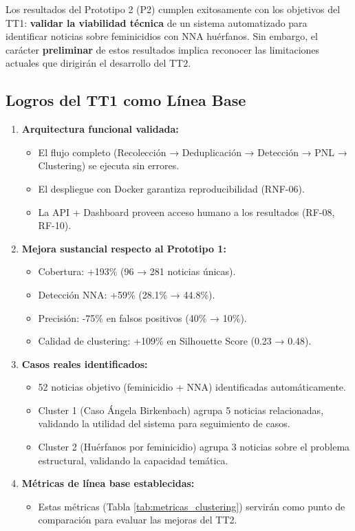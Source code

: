 Los resultados del Prototipo 2 (P2) cumplen exitosamente con los objetivos del TT1: \textbf{validar la viabilidad técnica} de un sistema automatizado para identificar noticias sobre feminicidios con NNA huérfanos. Sin embargo, el carácter \textbf{preliminar} de estos resultados implica reconocer las limitaciones actuales que dirigirán el desarrollo del TT2.

\subsection{Logros del TT1 como Línea Base}
\label{subsec:logros_tt1}

\begin{enumerate}
    \item \textbf{Arquitectura funcional validada:}
    \begin{itemize}
        \item El flujo completo (Recolección → Deduplicación → Detección → PNL → Clustering) se ejecuta sin errores.
        \item El despliegue con Docker garantiza reproducibilidad (RNF-06).
        \item La API + Dashboard proveen acceso humano a los resultados (RF-08, RF-10).
    \end{itemize}
    
    \item \textbf{Mejora sustancial respecto al Prototipo 1:}
    \begin{itemize}
        \item Cobertura: +193\% (96 → 281 noticias únicas).
        \item Detección NNA: +59\% (28.1\% → 44.8\%).
        \item Precisión: -75\% en falsos positivos (40\% → 10\%).
        \item Calidad de clustering: +109\% en Silhouette Score (0.23 → 0.48).
    \end{itemize}
    
    \item \textbf{Casos reales identificados:}
    \begin{itemize}
        \item 52 noticias objetivo (feminicidio + NNA) identificadas automáticamente.
        \item Cluster 1 (Caso Ángela Birkenbach) agrupa 5 noticias relacionadas, validando la utilidad del sistema para seguimiento de casos.
        \item Cluster 2 (Huérfanos por feminicidio) agrupa 3 noticias sobre el problema estructural, validando la capacidad temática.
    \end{itemize}
    
    \item \textbf{Métricas de línea base establecidas:}
    \begin{itemize}
        \item Estas métricas (Tabla \ref{tab:metricas_clustering}) servirán como punto de comparación para evaluar las mejoras del TT2.
    \end{itemize}
\end{enumerate}

